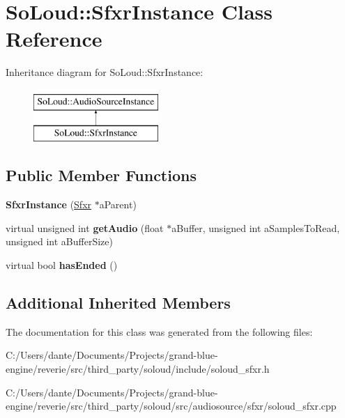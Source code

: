 \hypertarget{class_so_loud_1_1_sfxr_instance}{}\section{So\+Loud\+::Sfxr\+Instance Class Reference}
\label{class_so_loud_1_1_sfxr_instance}
Inheritance diagram for So\+Loud\+::Sfxr\+Instance\+:\begin{figure}[H]
\begin{center}
\leavevmode
\includegraphics[height=2.000000cm]{class_so_loud_1_1_sfxr_instance}
\end{center}
\end{figure}
\subsection*{Public Member Functions}
\begin{DoxyCompactItemize}
\item 
\mbox{\label{class_so_loud_1_1_sfxr_instance_a2308816da00b1f5f191e90c9bc97e146}} 
{\bfseries Sfxr\+Instance} (\mbox{\hyperlink{class_so_loud_1_1_sfxr}{Sfxr}} $\ast$a\+Parent)
\item 
\mbox{\label{class_so_loud_1_1_sfxr_instance_a72b4f8db93f970cf5f1d40d21c9f30b7}} 
virtual unsigned int {\bfseries get\+Audio} (float $\ast$a\+Buffer, unsigned int a\+Samples\+To\+Read, unsigned int a\+Buffer\+Size)
\item 
\mbox{\label{class_so_loud_1_1_sfxr_instance_a831bcb775ffd6294460f9c5fcce578ce}} 
virtual bool {\bfseries has\+Ended} ()
\end{DoxyCompactItemize}
\subsection*{Additional Inherited Members}


The documentation for this class was generated from the following files\+:\begin{DoxyCompactItemize}
\item 
C\+:/\+Users/dante/\+Documents/\+Projects/grand-\/blue-\/engine/reverie/src/third\+\_\+party/soloud/include/soloud\+\_\+sfxr.\+h\item 
C\+:/\+Users/dante/\+Documents/\+Projects/grand-\/blue-\/engine/reverie/src/third\+\_\+party/soloud/src/audiosource/sfxr/soloud\+\_\+sfxr.\+cpp\end{DoxyCompactItemize}
